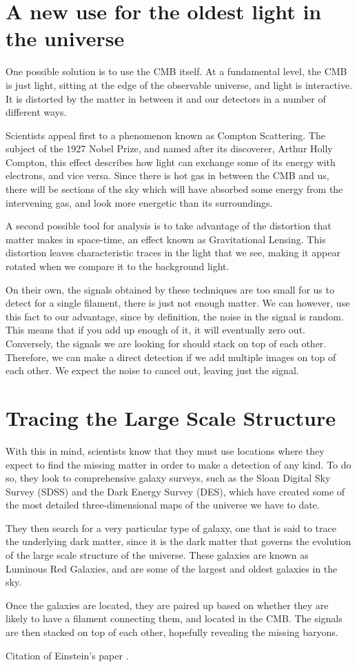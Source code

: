 \documentclass{nature}
\begin{document}
\section{A new use for the oldest light in the universe}

One possible solution is to use the CMB itself. At a fundamental level, the CMB is just light, sitting at the edge of the observable universe, and light is interactive. It is distorted by the matter in between it and our detectors in a number of different ways.

Scientists appeal first to a phenomenon known as Compton Scattering. The subject of the 1927 Nobel Prize, and named after its discoverer, Arthur Holly Compton, this effect describes how light can exchange some of its energy with electrons, and vice versa. Since there is hot gas in between the CMB and us, there will be sections of the sky which will have absorbed some energy from the intervening gas, and look more energetic than its surroundings. 

A second possible tool for analysis is to take advantage of the distortion that matter makes in space-time, an effect known as Gravitational Lensing. This distortion leaves characteristic traces in the light that we see, making it appear rotated when we compare it to the background light. 

On their own, the signals obtained by these techniques are too small for us to detect for a single filament, there is just not enough matter. We can however, use this fact to our advantage, since by definition, the noise in the signal is random. This means that if you add up enough of it, it will eventually zero out. Conversely, the signals we are looking for should stack on top of each other. Therefore, we can make a direct detection if we add multiple images on top of each other. We expect the noise to cancel out, leaving just the signal.

\section{Tracing the Large Scale Structure}
With this in mind, scientists know that they must use locations where they expect to find the missing matter in order to make a detection of any kind. To do so, they look to comprehensive galaxy surveys, such as the Sloan Digital Sky Survey (SDSS) and the Dark Energy Survey (DES), which have created some of the most detailed three-dimensional maps of the universe we have to date. 

They then search for a very particular type of galaxy, one that is said to trace the underlying dark matter, since it is the dark matter that governs the evolution of the large scale structure of the universe. These galaxies are known as Luminous Red Galaxies, and are some of the largest and oldest galaxies in the sky. 

Once the galaxies are located, they are paired up based on whether they are likely to have a filament connecting them, and located in the CMB. The signals are then stacked on top of each other, hopefully revealing the missing baryons.


Citation of Einstein's paper \cite{Einstein}.



\end{document}
